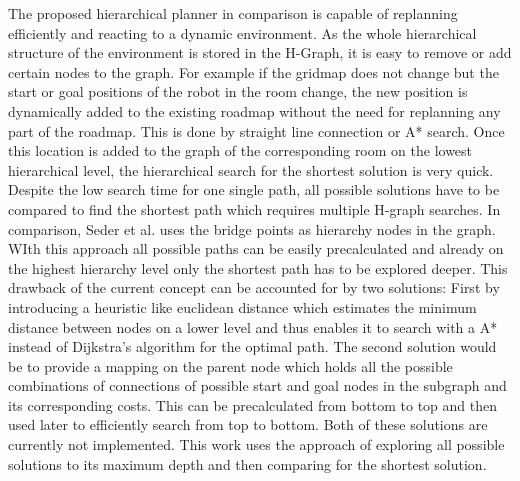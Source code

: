 The proposed hierarchical planner in comparison is capable of replanning efficiently and reacting to a dynamic environment. As the whole hierarchical structure of the environment is stored in the H-Graph, it is easy to remove or add certain nodes to the graph. For example if the gridmap does not change but the start or goal positions of the robot in the room change, the new position is dynamically added to the existing roadmap without the need for replanning any part of the roadmap. This is done by straight line connection or A* search. Once this location is added to the graph of the corresponding room on the lowest hierarchical level, the hierarchical search for the shortest solution is very quick. Despite the low search time for one single path, all possible solutions have to be compared to find the shortest path which requires multiple H-graph searches. In comparison, Seder et al. \cite{seder_hierarchical_2011} uses the bridge points as hierarchy nodes in the graph. WIth this approach all possible paths can be easily precalculated and already on the highest hierarchy level only the shortest path has to be explored deeper. This drawback of the current concept can be accounted for by two solutions: First by introducing a heuristic like euclidean distance which estimates the minimum distance between nodes on a lower level and thus enables it to search with a A* instead of Dijkstra's algorithm for the optimal path. The second solution would be to provide a mapping on the parent node which holds all the possible combinations of connections of possible start and goal nodes in the subgraph and its corresponding costs. This can be precalculated from bottom to top and then used later to efficiently search from top to bottom. Both of these solutions are currently not implemented. This work uses the approach of exploring all possible solutions to its maximum depth and then comparing for the shortest solution.

